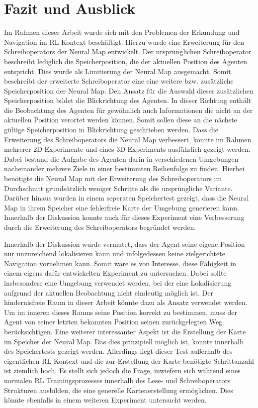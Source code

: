 \chapter{Fazit und Ausblick}

Im Rahmen dieser Arbeit wurde sich mit den Problemen der Erkundung und Navigation im RL Kontext beschäftigt. Hierzu wurde eine Erweiterung für den Schreiboperators der Neural Map entwickelt. Der ursprünglichen Schreiboperator beschreibt lediglich die Speicherposition, die der aktuellen Position des Agenten entspricht. Dies wurde als Limitierung der Neural Map ausgemacht. Somit beschreibt der erweiterte Schreiboperator eine eine weitere bzw. zusätzliche Speicherposition der Neural Map. Den Ansatz für die Auswahl dieser zusätzlichen Speicherposition bildet die Blickrichtung des Agenten. In dieser Richtung enthält die Beobachtung des Agenten für gewöhnlich auch Informationen die nicht an der aktuellen Position verortet werden können. Somit sollen diese an die nächste gültige Speicherposition in Blickrichtung geschrieben werden. Dass die Erweiterung des Schreiboperators die Neural Map verbessert, konnte im Rahmen mehrerer 2D-Experimente und eines 3D-Experiments ausführlich gezeigt werden. Dabei bestand die Aufgabe des Agenten darin in verschiedenen Umgebungen nacheinander mehrere Ziele in einer bestimmten Reihenfolge zu finden. Hierbei benötigte die Neural Map mit der Erweiterung des Schreiboperators im Durchschnitt grundsätzlich weniger Schritte als die ursprüngliche Variante. Darüber hinaus wurden in einem seperaten Speichertest gezeigt, dass die Neural Map in ihrem Speicher eine fehlerfreie Karte der Umgebung generieren kann. Innerhalb der Diskussion konnte auch für dieses Experiment eine Verbesserung durch die Erweiterung des Schreiboperators begründet werden.



Innerhalb der Diskussion wurde vermutet, dass der Agent seine eigene Position nur unzureichend lokalisieren kann und infolgedessen keine zielgerichtete Navigation vornehmen kann. Somit wäre es von Interesse, diese Fähigkeit in einem eigens dafür entwickelten Experiment zu untersuchen. Dabei sollte insbesondere eine Umgebung verwendet werden, bei der eine Lokalisierung aufgrund der aktuellen Beobachtung nicht eindeutig möglich ist. Der hindernisfreie Raum in dieser Arbeit könnte dazu als Ansatz verwendet werden. Um im inneren dieses Raums seine Position korrekt zu bestimmen, muss der Agent von seiner letzten bekannten Position seinen zurückgelegten Weg berücksichtigen. Eine weiterer interessanter Aspekt ist die Erstellung der Karte im Speicher der Neural Map. Das dies prinzipiell möglich ist, konnte innerhalb des Speichertests gezeigt werden. Allerdings liegt dieser Test außerhalb des eigentlichen RL Kontext und die zur Erstellung der Karte benötigte Schrittanzahl ist ziemlich hoch. Es stellt sich jedoch die Frage, inwiefern sich während eines normalen RL Trainingsprozesses innerhalb des Lese- und Schreiboperators Strukturen ausbilden, die eine generelle Kartenerstellung ermöglichen. Dies könnte ebenfalls in einem weiteren Experiment untersucht werden.
